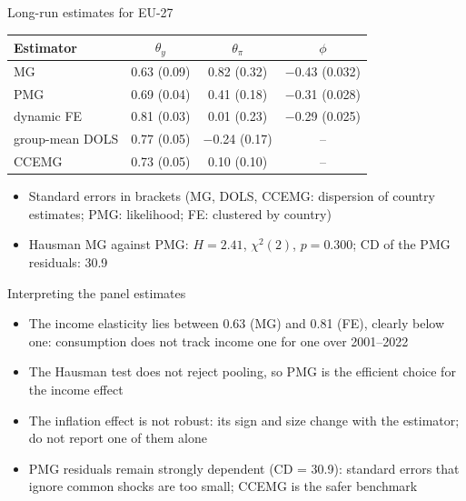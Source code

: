 \begin{frame}{Long-run estimates for EU-27}
\itemsize{\small}
\begin{center}
\footnotesize
\begin{tabular}{lccc}
\toprule
\textbf{Estimator} & $\theta_y$ & $\theta_\pi$ & $\phi$ \\
\midrule
MG & 0.63 (0.09) & 0.82 (0.32) & \ensuremath{-}0.43 (0.032) \\
PMG & 0.69 (0.04) & 0.41 (0.18) & \ensuremath{-}0.31 (0.028) \\
dynamic FE & 0.81 (0.03) & 0.01 (0.23) & \ensuremath{-}0.29 (0.025) \\
group-mean DOLS & 0.77 (0.05) & \ensuremath{-}0.24 (0.17) & -- \\
CCEMG & 0.73 (0.05) & 0.10 (0.10) & -- \\
\bottomrule
\end{tabular}
\end{center}
\begin{itemize}
    \item Standard errors in brackets (MG, DOLS, CCEMG: dispersion of country estimates; PMG: likelihood; FE: clustered by country)
    \item Hausman MG against PMG: $H = 2.41$, $\chi^2(2)$, $p = 0.300$; CD of the PMG residuals: 30.9
\end{itemize}
\end{frame}

\begin{frame}{Interpreting the panel estimates}
\itemsize{\small}
\begin{itemize}
    \item The income elasticity lies between 0.63 (MG) and 0.81 (FE), clearly below one: consumption does not track income one for one over 2001--2022
    \item The Hausman test does not reject pooling, so PMG is the efficient choice for the income effect
    \item The inflation effect is not robust: its sign and size change with the estimator; do not report one of them alone
    \item PMG residuals remain strongly dependent (CD = 30.9): standard errors that ignore common shocks are too small; CCEMG is the safer benchmark
\end{itemize}
\end{frame}

